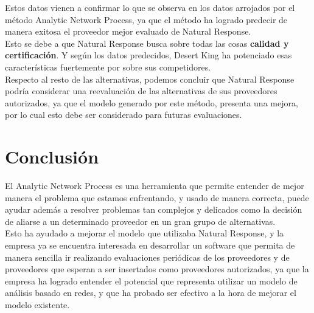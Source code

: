 \documentclass[12pt,twocolumn]{article}
\begin{document}
Estos datos vienen a confirmar lo que se observa en los datos arrojados por el método Analytic Network Process, ya que el método ha logrado predecir de manera exitosa el proveedor mejor evaluado de Natural Response.\\

Esto se debe a que Natural Response busca sobre todas las cosas \textbf{calidad y certificación}. Y según los datos predecidos, Desert King ha potenciado esas características fuertemente por sobre sus competidores.\\
Respecto al resto de las alternativas, podemos concluir que Natural Response podría considerar una reevaluación de las alternativas de sus proveedores autorizados, ya que el modelo generado por este método, presenta una mejora, por lo cual esto debe ser considerado para futuras evaluaciones.

\newpage
\section{Conclusión}
El Analytic Network Process es una herramienta que permite entender de mejor manera el problema que estamos enfrentando, y usado de manera correcta, puede ayudar además a resolver problemas tan complejos y delicados como la decisión de aliarse a un determinado proveedor en un gran grupo de alternativas.\\
Esto ha ayudado a mejorar el modelo que utilizaba Natural Response, y la empresa ya se encuentra interesada en desarrollar un software que permita de manera sencilla ir realizando evaluaciones periódicas de los proveedores y de proveedores que esperan a ser insertados como proveedores autorizados, ya que la empresa ha logrado entender el potencial que representa utilizar un modelo de análisis basado en redes, y que ha probado ser efectivo a la hora de mejorar el modelo existente.
\newpage
\end{document}
